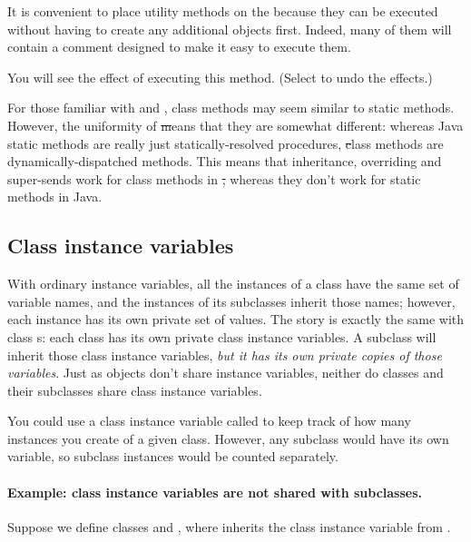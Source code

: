 \documentclass[a4paper,10pt,twoside]{book}
\begin{document}
It is convenient to place utility methods on the  because they can be executed without having to create any additional objects first.
Indeed, many of them will contain a comment designed to make it easy to execute them.

You will see the effect of executing this method.  (Select  to undo the effects.)

For those familiar with  and ,  class methods may seem similar to static methods. 
However, the uniformity of \st means that they are somewhat different: whereas Java static methods are really just statically-resolved procedures, \st class methods are dynamically-dispatched methods.  This means that inheritance, overriding and super-sends work for class methods in \st, whereas they don't work for static methods in Java.  

\subsection{Class instance variables}
With ordinary instance variables, all the instances of a class have the same set of variable names, and the instances of its subclasses inherit those names; however, each instance has its own private set of values.
The story is exactly the same with class s: each class has its own private class instance variables.
A subclass will inherit those class instance variables, \emph{but it has its own private copies of those variables}.
Just as objects don't share instance variables, neither do classes and their subclasses share class instance variables.

You could use a class instance variable called  to keep track of how many instances you create of a given class.
However, any subclass would have its own  variable, so subclass instances would be counted separately.

\paragraph{Example: class instance variables are not shared with subclasses.}
Suppose we define classes  and , where  inherits the class instance variable  from .
\end{document}
